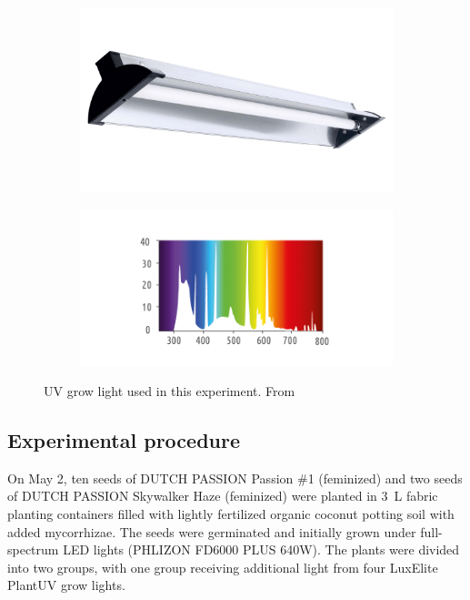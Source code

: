 \begin{figure}[htbp]
    \begin{subfigure}[t]{.48\textwidth}
        \includegraphics[width=\linewidth]{LuxElite_PlantUV}
        \label{fig:uv_grow_light_img}
    \end{subfigure}
    \begin{subfigure}[t]{.48\textwidth}
        \includegraphics[width=\linewidth]{LuxElite_PlantUV_light-spectrum}
        \label{fig:uv_grow_light_spectrum}
    \end{subfigure}
    \caption[UV grow light used in this experiment]{UV grow light used in this experiment. From }
    \label{fig:uv_grow_light}
\end{figure}

\subsection{Experimental procedure}

On May 2, ten seeds of DUTCH PASSION Passion \#1 (feminized) and two seeds of DUTCH PASSION Skywalker Haze (feminized) were planted in \qty[mode=text]{3}{\L} fabric planting containers filled with lightly fertilized organic coconut potting soil with added mycorrhizae. The seeds were germinated and initially grown under full-spectrum LED lights (PHLIZON FD6000 PLUS 640W). The plants were divided into two groups, with one group receiving additional light from four LuxElite PlantUV grow lights.

